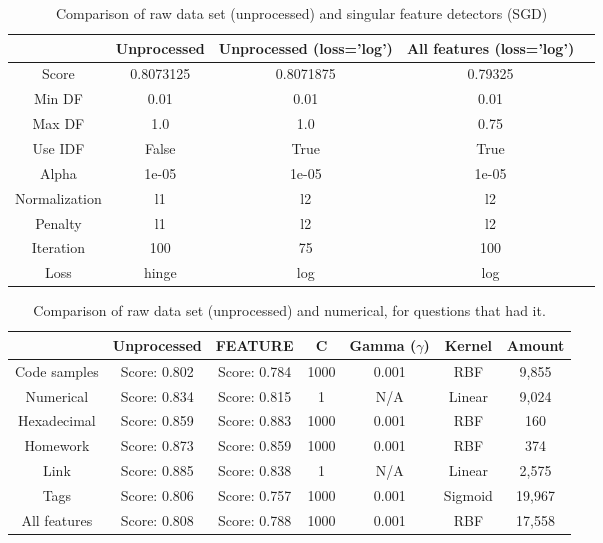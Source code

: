 \begin{table}[!h]%
	\centering
	\begin{tabular}{| c| c | c | c | c |}
		\hline
		~				& Unprocessed		& Unprocessed (loss='log')		& All features (loss='log')	\\ \hline
		Score 			& 0.8073125				& 0.8071875					& 0.79325					\\ \hline
		Min DF 			& 0.01					& 0.01						& 0.01						\\ \hline
		Max DF 			& 1.0					& 1.0						& 0.75						\\ \hline
		Use IDF			& False					& True						& True						\\ \hline
		Alpha 			& 1e-05					& 1e-05						& 1e-05						\\ \hline
		Normalization 	& l1					& l2						& l2						\\ \hline		
		Penalty 		& l1					& l2						& l2						\\ \hline
		Iteration 		& 100					& 75						& 100						\\ \hline
		Loss 			& hinge					& log						& log						\\ \hline		
	\end{tabular}
	\caption{Comparison of raw data set (unprocessed) and singular feature detectors (SGD)}
	\label{tab:unprocessed_vs_all_feature_detectors_sgd_so}
\end{table}


\begin{table}[!h]%
	\centering
	\begin{tabular}{| c | c | c | c | c | c | c |}
		\hline
		~				& Unprocessed		& FEATURE		& C			& Gamma ($\gamma$)	& Kernel	& Amount	 	\\ \hline
		Code samples 	& Score: 0.802		& Score: 0.784	& 1000		& 0.001				& RBF 		& 9,855 		\\ \hline
		Numerical		& Score: 0.834		& Score: 0.815	& 1			& N/A				& Linear	& 9,024			\\ \hline
		Hexadecimal		& Score: 0.859		& Score: 0.883	& 1000		& 0.001				& RBF		& 160 			\\ \hline
		Homework 		& Score: 0.873		& Score: 0.859	& 1000		& 0.001				& RBF		& 374 			\\ \hline
		Link			& Score: 0.885		& Score: 0.838	& 1			& N/A				& Linear	& 2,575			\\ \hline
		Tags			& Score: 0.806		& Score: 0.757	& 1000		& 0.001				& Sigmoid	& 19,967		\\ \hline
		All features	& Score: 0.808		& Score: 0.788	& 1000		& 0.001				& RBF 		& 17,558		\\ \hline
	\end{tabular}
	\caption{Comparison of raw data set (unprocessed) and numerical, for questions that had it.}
	\label{tab:comparison_of_feature_occurences_only}
\end{table}




